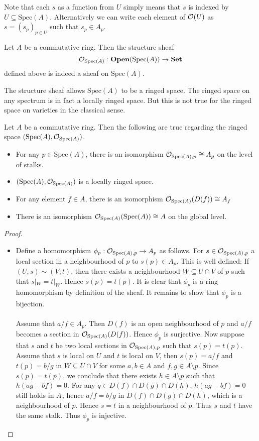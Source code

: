 \documentclass[a4paper]{article}
\begin{document}
Note that each $s$ as a function from $U$ simply means that $s$ is indexed by $U\subseteq\text{Spec}(A)$. Alternatively we can write each element of $\mathcal{O}(U)$ as $s=(s_p)_{p\in U}$ such that $s_p\in A_p$. 

\begin{thm}{}{} Let $A$ be a commutative ring. Then the structure sheaf $$\mathcal{O}_{\text{Spec}(A)}:\bold{Open}(\text{Spec}(A))\to\bold{Set}$$ defined above is indeed a sheaf on $\text{Spec}(A)$. 
\end{thm}

The structure sheaf allows $\text{Spec}(A)$ to be a ringed space. The ringed space on any spectrum is in fact a locally ringed space. But this is not true for the ringed space on varieties in the classical sense. 

\begin{prp}{}{} Let $A$ be a commutative ring. Then the following are true regarding the ringed space $(\text{Spec}(A),\mathcal{O}_{\text{Spec}(A)})$. 
\begin{itemize}
\item For any $p\in\text{Spec}(A)$, there is an isomorphism $\mathcal{O}_{\text{Spec}(A),p}\cong A_p$ on the level of stalks. 
\item $(\text{Spec}(A),\mathcal{O}_{\text{Spec}(A)})$ is a locally ringed space. 
\item For any element $f\in A$, there is an isomorphism $\mathcal{O}_{\text{Spec}(A)}(D(f))\cong A_f$
\item There is an isomorphism $\mathcal{O}_{\text{Spec}(A)}(\text{Spec}(A))\cong A$ on the global level. 
\end{itemize} \tcbline
\begin{proof}~\\
\begin{itemize}
\item Define a homomorphism $\phi_p:\mathcal{O}_{\text{Spec}(A),p}\to A_p$ as follows. For $s\in\mathcal{O}_{\text{Spec}(A),p}$ a local section in a neighbourhood of $p$ to $s(p)\in A_p$. This is well defined: If $(U,s)\sim(V,t)$, then there exists a neighbourhood $W\subseteq U\cap V$ of $p$ such that $s|_W=t|_W$. Hence $s(p)=t(p)$. It is clear that $\phi_p$ is a ring homomorphism by definition of the sheaf. It remains to show that $\phi_p$ is a bijection. \\~\\

Assume that $a/f\in A_p$. Then $D(f)$ is an open neighbourhood of $p$ and $a/f$ becomes a section in $\mathcal{O}_{\text{Spec}(A)}(D(f))$. Hence $\phi_p$ is surjective. Now suppose that $s$ and $t$ be two local sections in $\mathcal{O}_{\text{Spec}(A),p}$ such that $s(p)=t(p)$. Assume that $s$ is local on $U$ and $t$ is local on $V$, then $s(p)=a/f$ and $t(p)=b/g$ in $W\subseteq U\cap V$ for some $a,b\in A$ and $f,g\in A\setminus p$. Since $s(p)=t(p)$, we conclude that there exists $h\in A\setminus p$ such that $h(ag-bf)=0$. For any $q\in D(f)\cap D(g)\cap D(h)$, $h(ag-bf)=0$ still holds in $A_q$ hence $a/f=b/g$ in $D(f)\cap D(g)\cap D(h)$, which is a neighbourhood of $p$. Hence $s=t$ in a neighbourhood of $p$. Thus $s$ and $t$ have the same stalk. Thus $\phi_p$ is injective. 


\end{itemize}
\end{proof}
\end{prp}
\end{document}
